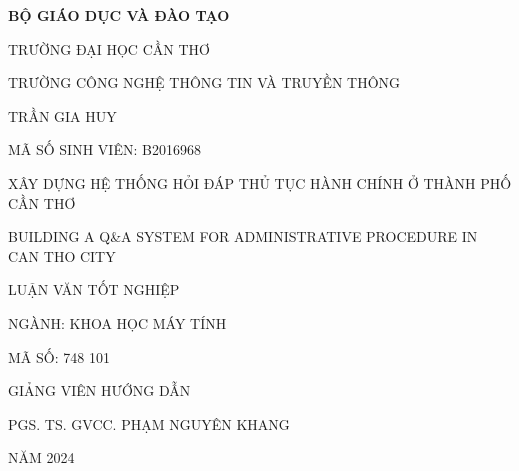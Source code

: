 \begin{center}
    \bf BỘ GIÁO DỤC VÀ ĐÀO TẠO

    TRƯỜNG ĐẠI HỌC CẦN THƠ

    TRƯỜNG CÔNG NGHỆ THÔNG TIN VÀ TRUYỀN THÔNG

    \vspace{2cm}

    TRẦN GIA HUY

    MÃ SỐ SINH VIÊN: B2016968

    \vspace{2cm}

    {\large
        XÂY DỰNG HỆ THỐNG HỎI ĐÁP THỦ TỤC HÀNH CHÍNH Ở THÀNH PHỐ CẦN THƠ
        
        \vspace{1cm}
        BUILDING A Q\&A SYSTEM FOR ADMINISTRATIVE PROCEDURE IN CAN THO CITY
    }

    \vspace{2cm}

    LUẬN VĂN TỐT NGHIỆP

    NGÀNH: KHOA HỌC MÁY TÍNH

    MÃ SỐ: 748 101

    \vspace{2cm}

    GIẢNG VIÊN HƯỚNG DẪN

    PGS. TS. GVCC. PHẠM NGUYÊN KHANG

    \vspace{4cm}

    NĂM 2024
\end{center}